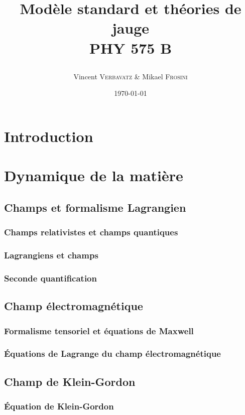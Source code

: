 \documentclass{article}
\title{Modèle standard et théories de jauge \n{2} \\\textsc{PHY 575 B}\\\n2 \date{\today}}
\author{Vincent \textsc{Verbavatz} \& Mikael \textsc{Frosini}}
\begin{document}
		
		\maketitle
		\pagebreak
		\tableofcontents
		
		\pagebreak
		
	\section{Introduction}

	\section{Dynamique de la matière}
		\subsection{Champs et formalisme Lagrangien}
			\subsubsection{Champs relativistes et champs quantiques}
			\subsubsection{Lagrangiens et champs}
			\subsubsection{Seconde quantification}
		\subsection{Champ électromagnétique}
			\subsubsection{Formalisme tensoriel et équations de Maxwell}
			\subsubsection{Équations de Lagrange du champ électromagnétique}	
		\subsection{Champ de Klein-Gordon}
			\subsubsection{Équation de Klein-Gordon}
\end{document}
